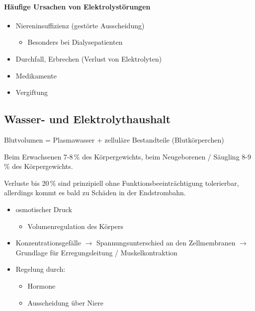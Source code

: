
\paragraph{Häufige Ursachen von
Elektrolystörungen}

\begin{itemize}
    \item Niereninsuffizienz (gestörte Ausscheidung)
    \begin{itemize}
        \item Besonders bei Dialysepatienten
    \end{itemize}
    \item Durchfall, Erbrechen (Verlust von Elektrolyten)
    \item Medikamente
    \item Vergiftung
\end{itemize}



\subsection{Wasser- und Elektrolythaushalt}

Blutvolumen = Plasmawasser + zelluläre Bestandteile (Blutkörperchen)

Beim Erwachsenen 7-8\,\% des Körpergewichts, beim
Neugeborenen / Säugling 8-9\,\% des Körpergewichts. 

Verluste bis 20\,\% sind prinzipiell ohne
Funktionsbeeinträchtigung tolerierbar, allerdings
kommt es bald zu Schäden in der Endstrombahn. 


\begin{itemize}
    \item osmotischer Druck
    \begin{itemize}
        \item Volumenregulation des Körpers
    \end{itemize}
    \item Konzentrationsgefälle ${\rightarrow}$ Spannungsunterschied an
    den Zellmembranen ${\rightarrow}$ Grundlage für Erregungsleitung /
    Muskelkontraktion
    \item Regelung durch:
    \begin{itemize}
        \item Hormone 
        \item Ausscheidung über Niere
    \end{itemize}
\end{itemize}

